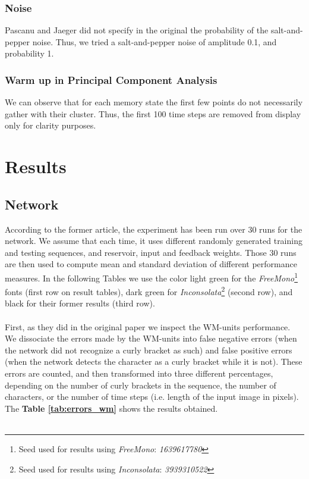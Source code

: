 \subsubsection{Noise}

Pascanu and Jaeger did not specify in the original the probability of the salt-and-pepper noise. Thus, we tried a salt-and-pepper noise of amplitude 0.1, and probability 1. \\

\subsubsection{Warm up in Principal Component Analysis}

We can observe that for each memory state the first few points do not necessarily gather with their cluster. Thus, the first 100 time steps are removed from display only for clarity purposes.

\section{Results}
\label{s:result}

\subsection{Network}
According to the former article, the experiment has been run over 30 runs for the network.
We assume that each time, it uses different randomly generated training and testing sequences, and reservoir, input and feedback weights. Those 30 runs are then used to compute mean and standard deviation of different performance measures. In the following Tables we use the color light green for the \textit{FreeMono}\footnote{Seed used for results using \textit{FreeMono}: \textit{1639617780}} fonts (first row on result tables), dark green for \textit{Inconsolata}\footnote{Seed used for results using \textit{Inconsolata}: \textit{3939310522}} (second row), and black for their former results (third row). \\
\\
First, as they did in the original paper we inspect the WM-units performance.
We dissociate the errors made by the WM-units into false negative errors (when the network did not recognize a curly bracket as such) and false positive errors (when the network detects the character as a curly bracket while it is not).
These errors are counted, and then transformed into three different percentages, depending on the number of curly brackets in the sequence, the number of characters, or the number of time steps (i.e. length of the input image in pixels). The \textbf{Table \ref{tab:errors_wm}} shows the results obtained. \\
\\

